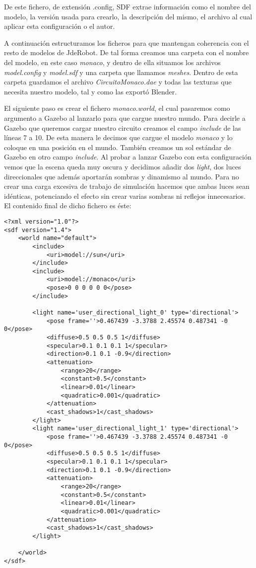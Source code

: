 De este fichero, de extensión .config, SDF extrae información como el nombre del modelo, la versión usada para crearlo, la descripción del mismo, el archivo al cual aplicar esta configuración o el autor.

A continuación estructuramos los ficheros para que mantengan coherencia con el resto de modelos de JdeRobot. De tal forma creamos una carpeta con el nombre del modelo, en este caso \textit{monaco}, y dentro de ella situamos los archivos \textit{model.config} y \textit{model.sdf} y una carpeta que llamamos \textit{meshes}. Dentro de esta carpeta guardamos el archivo \textit{CircuitoMonaco.dae} y todas las texturas que necesita nuestro modelo, tal y como las exportó Blender.

El siguiente paso es crear el fichero \textit{monaco.world}, el cual pasaremos como argumento a Gazebo al lanzarlo para que cargue nuestro mundo. Para decirle a Gazebo que queremos cargar nuestro circuito creamos el campo \textit{include} de las líneas 7 a 10. De esta manera le decimos que cargue el modelo \textit{monaco} y lo coloque en una posición en el mundo. También creamos un sol estándar de Gazebo en otro campo \textit{include}. Al probar a lanzar Gazebo con esta configuración vemos que la escena queda muy oscura y decidimos añadir dos \textit{light}, dos luces direccionales que además aportarán sombras y dinamismo al mundo. Para no crear una carga excesiva de trabajo de simulación hacemos que ambas luces sean idénticas, potenciando el efecto sin crear varias sombras ni reflejos innecesarios. El contenido final de dicho fichero es éste:
\lstset{language=xml}
\begin{lstlisting}
<?xml version="1.0"?>
<sdf version="1.4">
	<world name="default">
		<include>
			<uri>model://sun</uri>
		</include>
		<include>
			<uri>model://monaco</uri>
			<pose>0 0 0 0 0 0</pose>
		</include>

		<light name='user_directional_light_0' type='directional'>
			<pose frame=''>0.467439 -3.3788 2.45574 0.487341 -0 0</pose>
			<diffuse>0.5 0.5 0.5 1</diffuse>
			<specular>0.1 0.1 0.1 1</specular>
			<direction>0.1 0.1 -0.9</direction>
			<attenuation>
				<range>20</range>
				<constant>0.5</constant>
				<linear>0.01</linear>
				<quadratic>0.001</quadratic>
			</attenuation>
			<cast_shadows>1</cast_shadows>
		</light>
		<light name='user_directional_light_1' type='directional'>
			<pose frame=''>0.467439 -3.3788 2.45574 0.487341 -0 0</pose>
			<diffuse>0.5 0.5 0.5 1</diffuse>
			<specular>0.1 0.1 0.1 1</specular>
			<direction>0.1 0.1 -0.9</direction>
			<attenuation>
				<range>20</range>
				<constant>0.5</constant>
				<linear>0.01</linear>
				<quadratic>0.001</quadratic>
			</attenuation>
			<cast_shadows>1</cast_shadows>
		</light>

	</world>
</sdf>
\end{lstlisting}

